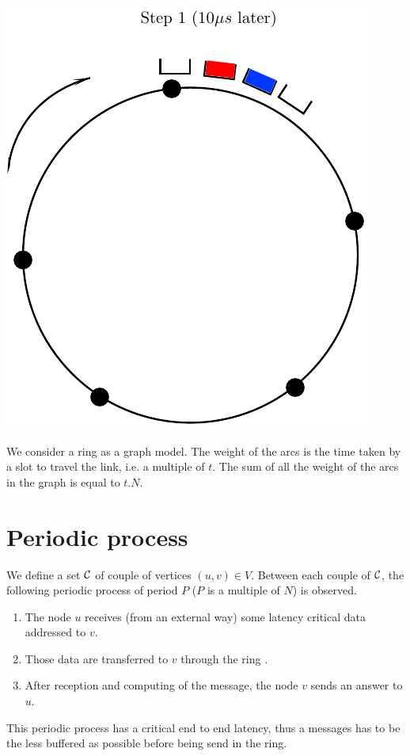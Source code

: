 \documentclass[a4paper,10pt]{article}
\begin{document}
\begin{center}
      \includegraphics[scale=0.5]{anneau2.pdf}
  
\end{center}

We consider a ring as a graph model. The weight of the arcs is the time taken by a slot to travel the link, i.e. a multiple of $t$. The sum of all the weight of the arcs in the graph is equal to $t.N$.

\section*{Periodic process}
We define a set $\cal C$ of couple of vertices $(u,v) \in V$. Between each couple of $\cal C$, the following periodic process of period $P$ ($P$ is a multiple of $N$) is observed.
\begin{enumerate}
 \item The node $u$ receives (from an external way) some latency critical data addressed to $v$.
 \item Those data are transferred to $v$ through the ring .
 \item After reception and computing of the message, the node $v$ sends an answer to $u$.
\end{enumerate}
 This periodic process has a critical end to end latency, thus a messages has to be the less buffered as possible before being send in the ring.
 
\end{document}
